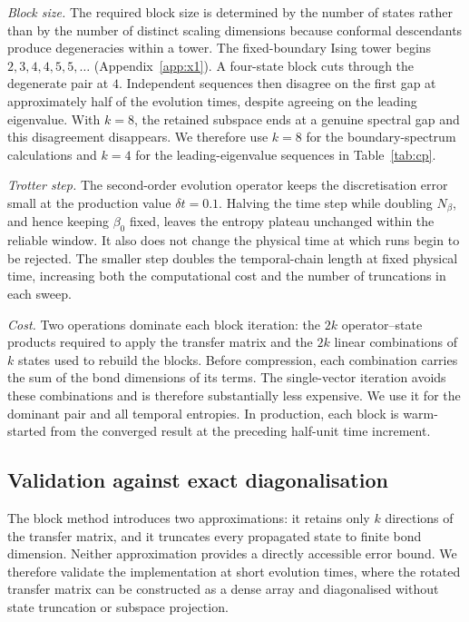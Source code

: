 \textit{Block size.} The required block size is determined by the number of states rather than by the number of distinct scaling dimensions because conformal descendants produce degeneracies within a tower. The fixed-boundary Ising tower begins $2,3,4,4,5,5,\dots$ (Appendix~\ref{app:x1}). A four-state block cuts through the degenerate pair at $4$. Independent sequences then disagree on the first gap at approximately half of the evolution times, despite agreeing on the leading eigenvalue. With $k=8$, the retained subspace ends at a genuine spectral gap and this disagreement disappears. We therefore use $k=8$ for the boundary-spectrum calculations and $k=4$ for the leading-eigenvalue sequences in Table~\ref{tab:cp}.

\textit{Trotter step.} The second-order evolution operator keeps the discretisation error small at the production value $\delta t=0.1$. Halving the time step while doubling $N_\beta$, and hence keeping $\beta_0$ fixed, leaves the entropy plateau unchanged within the reliable window. It also does not change the physical time at which runs begin to be rejected. The smaller step doubles the temporal-chain length at fixed physical time, increasing both the computational cost and the number of truncations in each sweep.

\textit{Cost.} Two operations dominate each block iteration: the $2k$ operator--state products required to apply the transfer matrix and the $2k$ linear combinations of $k$ states used to rebuild the blocks. Before compression, each combination carries the sum of the bond dimensions of its terms. The single-vector iteration avoids these combinations and is therefore substantially less expensive. We use it for the dominant pair and all temporal entropies. In production, each block is warm-started from the converged result at the preceding half-unit time increment.

\subsection{Validation against exact diagonalisation}
\label{app:blockpm:validation}

The block method introduces two approximations: it retains only $k$ directions of the transfer matrix, and it truncates every propagated state to finite bond dimension. Neither approximation provides a directly accessible error bound. We therefore validate the implementation at short evolution times, where the rotated transfer matrix can be constructed as a dense array and diagonalised without state truncation or subspace projection.

